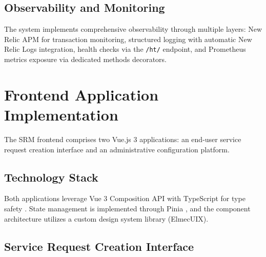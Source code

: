 \subsection{Observability and Monitoring}

The system implements comprehensive observability through multiple layers: New Relic APM for transaction monitoring, structured logging with automatic New Relic Logs integration, health checks via the \texttt{/ht/} endpoint, and Prometheus metrics exposure via dedicated methods decorators. %

%         

\section{Frontend Application Implementation}

The SRM frontend comprises two Vue.js 3 applications: an end-user service request creation interface and an administrative configuration platform.

\subsection{Technology Stack}

Both applications leverage Vue 3 Composition API with TypeScript for type safety \cite{vue3}. State management is implemented through Pinia \cite{pinia}, and the component architecture utilizes a custom design system library (ElmecUIX).

\subsection{Service Request Creation Interface}


